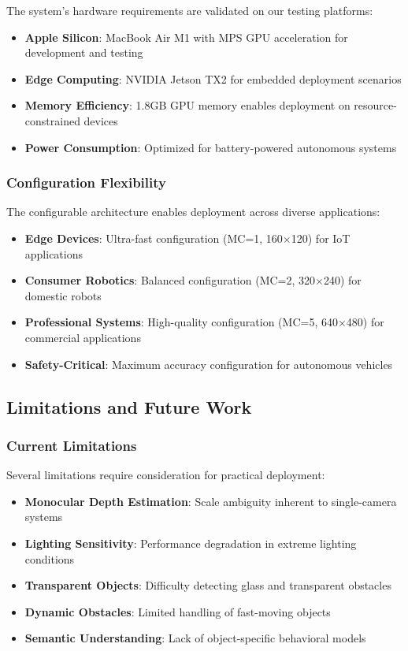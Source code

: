 \documentclass[12pt,oneside]{book}
\begin{document}
The system's hardware requirements are validated on our testing platforms:

\begin{itemize}
\item \textbf{Apple Silicon}: MacBook Air M1 with MPS GPU acceleration for development and testing
\item \textbf{Edge Computing}: NVIDIA Jetson TX2 for embedded deployment scenarios
\item \textbf{Memory Efficiency}: 1.8GB GPU memory enables deployment on resource-constrained devices
\item \textbf{Power Consumption}: Optimized for battery-powered autonomous systems
\end{itemize}

\subsubsection{Configuration Flexibility}

The configurable architecture enables deployment across diverse applications:

\begin{itemize}
\item \textbf{Edge Devices}: Ultra-fast configuration (MC=1, 160$\times$120) for IoT applications
\item \textbf{Consumer Robotics}: Balanced configuration (MC=2, 320$\times$240) for domestic robots
\item \textbf{Professional Systems}: High-quality configuration (MC=5, 640$\times$480) for commercial applications
\item \textbf{Safety-Critical}: Maximum accuracy configuration for autonomous vehicles
\end{itemize}

\subsection{Limitations and Future Work}

\subsubsection{Current Limitations}

Several limitations require consideration for practical deployment:

\begin{itemize}
\item \textbf{Monocular Depth Estimation}: Scale ambiguity inherent to single-camera systems
\item \textbf{Lighting Sensitivity}: Performance degradation in extreme lighting conditions
\item \textbf{Transparent Objects}: Difficulty detecting glass and transparent obstacles
\item \textbf{Dynamic Obstacles}: Limited handling of fast-moving objects
\item \textbf{Semantic Understanding}: Lack of object-specific behavioral models
\end{itemize}
\end{document}
